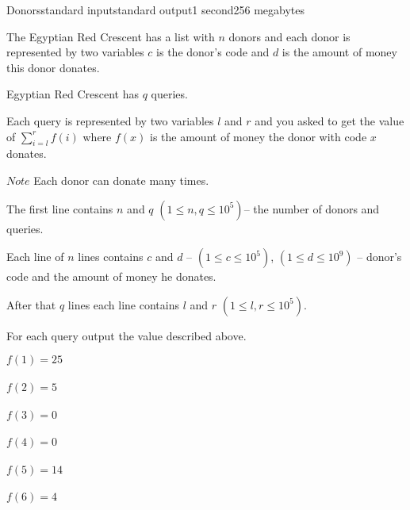 \begin{problem}{Donors}{standard input}{standard output}{1 second}{256 megabytes}

The Egyptian Red Crescent has a list with $n$ donors and each donor is represented by two variables $c$ is the donor's code and $d$ is the amount of money this donor donates.

Egyptian Red Crescent has $q$ queries. 

Each query is represented by two variables $l$ and $r$ and you asked to get the value of ${\sum_{i = l}^r f(i)}$ where $f(x)$ is the amount of money the donor with code $x$ donates.

$Note$ Each donor can donate many times.

\InputFile
The first line contains $n$ and $q$ $(1 \le n,q \le 10^5)$-- the number of donors and queries.

Each line of $n$ lines contains $c$ and $d$ -- $(1 \le c \le 10^5)$, $(1\le d\le 10^9)$ -- donor's code and the amount of money he donates.

After that $q$ lines each line contains $l$ and $r$ $(1 \le l,r \le 10^5)$.

\OutputFile
For each query output the value described above.

\Example

\begin{example}
%
\end{example}

\Note
$f(1) = 25$\\\\
$f(2) = 5$\\\\
$f(3) = 0$\\\\
$f(4) = 0$\\\\
$f(5) = 14$\\\\
$f(6) = 4$

\end{problem}

